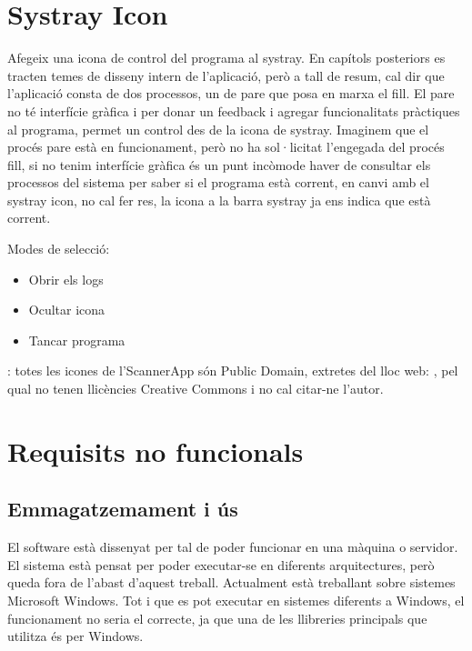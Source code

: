 \documentclass[letterpaper,11pt,catalan]{sphinxmanual}
\begin{document}
\section{Systray Icon}
\label{\detokenize{index:systray-icon}}
Afegeix una icona de control del programa al systray. En capítols posteriors es tracten
temes de disseny intern de l'aplicació, però a tall de resum, cal dir que l'aplicació
consta de dos processos, un de \sphinxquotedblleft{}pare\sphinxquotedblright{} que posa en marxa el \sphinxquotedblleft{}fill\sphinxquotedblright{}. El pare no té interfície
gràfica i per donar un feedback i agregar funcionalitats pràctiques al programa, permet
un control des de la icona de systray. Imaginem que el procés \sphinxquotedblleft{}pare\sphinxquotedblright{} està en funcionament,
però no ha sol·licitat l'engegada del procés \sphinxquotedblleft{}fill\sphinxquotedblright{}, si no tenim interfície gràfica és un punt
incòmode haver de consultar els processos del sistema per saber si el programa està corrent,
en canvi amb el systray icon, no cal fer res, la icona a la barra systray ja ens indica que
està corrent.

Modes de selecció:
\begin{itemize}
\item {} 
Obrir els logs

\item {} 
Ocultar icona

\item {} 
Tancar programa

\end{itemize}

: totes les icones de l'ScannerApp són Public Domain, extretes del lloc web: ,
pel qual no tenen llicències Creative Commons i no cal citar-ne l'autor.


\section{Requisits no funcionals}
\label{\detokenize{index:requisits-no-funcionals}}

\subsection{Emmagatzemament i ús}
\label{\detokenize{index:emmagatzemament-i-us}}
El software està dissenyat per tal de poder funcionar en una màquina o servidor. El sistema
està pensat per poder executar-se en diferents arquitectures, però queda fora de l'abast
d'aquest treball. Actualment està treballant sobre sistemes Microsoft Windows. Tot i que
es pot executar en sistemes diferents a Windows, el funcionament no seria el correcte,
ja que una de les llibreries principals que utilitza és per Windows.
\end{document}
